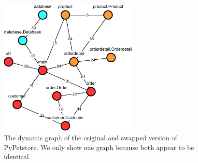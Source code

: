 \begin{figure}
    \caption[The dynamic graph of PyPetstore.]{The dynamic graph of the original and swapped version of PyPetstore. We only show one graph because both appear to be identical.}
    \label{fig:pypestore_dynamic_before}
    \begin{adjustbox}{center}
    \includegraphics[width=200pt]{figures/data/pypetstore_dynamic_original.pdf}
    \end{adjustbox}
\end{figure}